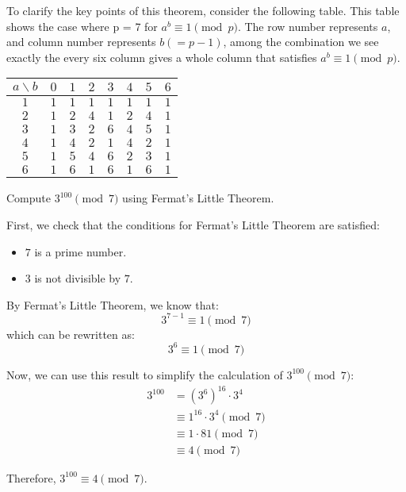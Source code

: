         To clarify the key points of this theorem, consider the following table. This table shows the case where p = 7 for $a^b\equiv 1 \pmod p$.
        The row number represents $a$, and column number represents $b (=p-1)$, among the combination we see exactly the every six column gives a whole 
        column that satisfies $a^b\equiv 1 \pmod p$.
        \begin{center}
            \begin{tabular}{|c|c|c|c|c|c|c|c|}
            \hline
            $a \backslash b$ & $0$ & $1$ & $2$ & $3$ & $4$ & $5$ & $6$ \\
            \hline
            $1$ & $1$ & $1$ & $1$ & $1$ & $1$ & $1$ & $1$ \\
            \hline
            $2$ & $1$ & $2$ & $4$ & $1$ & $2$ & $4$ & $1$ \\
            \hline
            $3$ & $1$ & $3$ & $2$ & $6$ & $4$ & $5$ & $1$ \\
            \hline
            $4$ & $1$ & $4$ & $2$ & $1$ & $4$ & $2$ & $1$ \\
            \hline
            $5$ & $1$ & $5$ & $4$ & $6$ & $2$ & $3$ & $1$ \\
            \hline
            $6$ & $1$ & $6$ & $1$ & $6$ & $1$ & $6$ & $1$ \\
            \hline
            \end{tabular}
        \end{center}
        \begin{example}
            Compute $3^{100} \pmod{7}$ using Fermat's Little Theorem.
        \end{example}
            \begin{solution}
            First, we check that the conditions for Fermat's Little Theorem are satisfied:
            \begin{itemize}
            \item $7$ is a prime number.
            \item $3$ is not divisible by $7$.
            \end{itemize}
            
            By Fermat's Little Theorem, we know that:
            \[
            3^{7-1} \equiv 1 \pmod{7}
            \]
            which can be rewritten as:
            \[
            3^6 \equiv 1 \pmod{7}
            \]
            
            Now, we can use this result to simplify the calculation of $3^{100} \pmod{7}$:
            \begin{align*}
            3^{100} &= (3^6)^{16} \cdot 3^4 \\
            &\equiv 1^{16} \cdot 3^4 \pmod{7} \\
            &\equiv 1 \cdot 81 \pmod{7} \\
            &\equiv 4 \pmod{7}
            \end{align*}
            
            Therefore, $3^{100} \equiv 4 \pmod{7}$.
            \end{solution}
            
